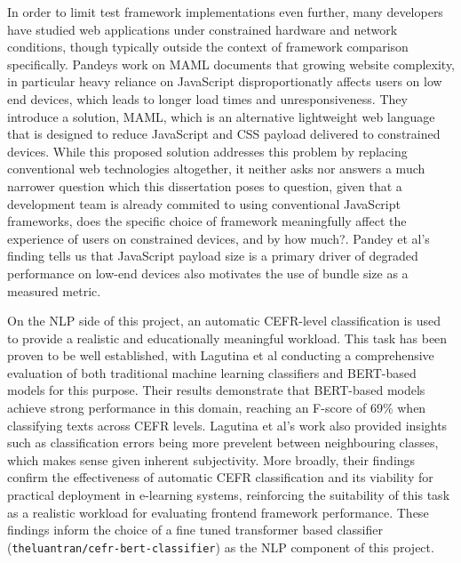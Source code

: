 \documentclass[conference]{IEEEtran}
\begin{document}
\medskip

In order to limit test framework implementations even further, many developers have studied web applications under constrained hardware and network conditions,  though typically outside the context of framework comparison specifically. Pandeys work \cite{pandey2024breaking} on MAML documents that growing website complexity, in particular heavy reliance on JavaScript disproportionatly affects users on low end devices, which leads to longer load times and unresponsiveness. They introduce a solution, MAML, which is an alternative lightweight web language that is designed to reduce JavaScript and CSS payload delivered to constrained
devices. While this proposed solution addresses this problem by replacing conventional web technologies altogether, it neither asks nor answers a much narrower question which this dissertation poses to question, given that a development team is already commited to  using conventional JavaScript frameworks, does the specific
choice of framework meaningfully affect the experience of users on constrained devices, and by how much?. Pandey et al's finding tells us that JavaScript payload size is a primary driver of degraded performance on low-end devices also motivates the use of bundle size as a measured metric.

\medskip

On the NLP side of this project, an automatic CEFR-level classification is used to provide a realistic and educationally meaningful workload. This task has been proven to be well established, with Lagutina et al \cite{lagutina2024text} conducting a comprehensive evaluation of both traditional machine learning classifiers and BERT-based models for this purpose. Their results demonstrate that BERT-based models achieve strong performance in this domain, reaching an F-score of 69\% when classifying texts across CEFR levels. Lagutina et al's work also provided insights such as classification errors being more prevelent between neighbouring classes, which makes sense given inherent subjectivity. More broadly, their findings confirm the effectiveness of automatic CEFR classification and its viability for practical deployment in e-learning systems, reinforcing the suitability of this task as a realistic workload for evaluating frontend framework performance. These findings inform the choice of a fine tuned transformer based classifier (\texttt{theluantran/cefr-bert-classifier}) as the NLP component of this project. 

\medskip
\end{document}

